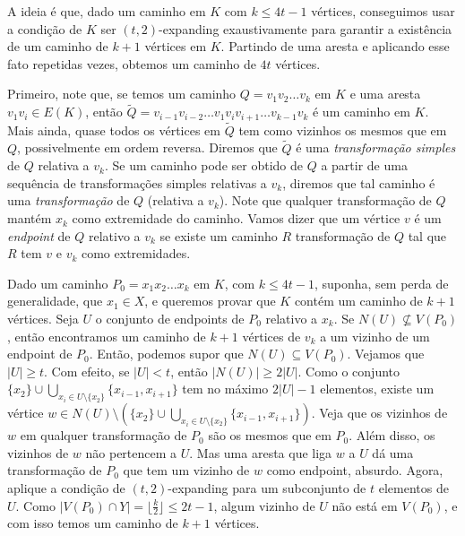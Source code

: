 \begin{dem}
	A ideia é que, dado um caminho em $K$ com $k\leq4t-1$ vértices, conseguimos usar a condição de $K$ ser $(t,2)$-expanding exaustivamente para garantir a existência de um caminho de $k+1$ vértices em $K$. Partindo de uma aresta e aplicando esse fato repetidas vezes, obtemos um caminho de $4t$ vértices.
	
	Primeiro, note que, se temos um caminho $Q = v_1v_2\dots v_k$ em $K$ e uma aresta $v_1v_i\in E(K)$, então $\tilde{Q} = v_{i-1}v_{i-2}\dots v_1v_iv_{i+1}\dots v_{k-1}v_k$ é um caminho em $K$. Mais ainda, quase todos os vértices em $\tilde{Q}$ tem como vizinhos os mesmos que em $Q$, possivelmente em ordem reversa. Diremos que $\tilde{Q}$ é uma \emph{transformação simples} de $Q$ relativa a $v_k$. Se um caminho pode ser obtido de $Q$ a partir de uma sequência de transformações simples relativas a $v_k$, diremos que tal caminho é uma \emph{transformação} de $Q$ (relativa a $v_k$). Note que qualquer transformação de $Q$ mantém $x_k$ como extremidade do caminho. Vamos dizer que um vértice $v$ é um \emph{endpoint} de $Q$ relativo a $v_k$ se existe um caminho $R$ transformação de $Q$ tal que $R$ tem $v$ e $v_k$ como extremidades.
	
	Dado um caminho $P_0 = x_1x_2\dots x_k$ em $K$, com $k\leq 4t-1$, suponha, sem perda de generalidade, que $x_1\in X$, e queremos provar que $K$ contém um caminho de $k+1$ vértices. Seja $U$ o conjunto de endpoints de $P_0$ relativo a $x_k$. Se $N(U)\not\subseteq V(P_0)$, então encontramos um caminho de $k+1$ vértices de $v_k$ a um vizinho de um endpoint de $P_0$. Então, podemos supor que $N(U)\subseteq V(P_0)$. Vejamos que $|U|\geq t$. Com efeito, se $|U|<t$, então $|N(U)|\geq2|U|$. Como o conjunto $\{x_2\}\cup\bigcup_{x_i\in U\setminus\{x_2\}}\{x_{i-1}, x_{i+1}\}$ tem no máximo $2|U|-1$ elementos, existe um vértice $w\in N(U)\setminus(\{x_2\}\cup\bigcup_{x_i\in U\setminus\{x_2\}}\{x_{i-1}, x_{i+1}\})$. Veja que os vizinhos de $w$ em qualquer transformação de $P_0$ são os mesmos que em $P_0$. Além disso, os vizinhos de $w$ não pertencem a $U$. Mas uma aresta que liga $w$ a $U$ dá uma transformação de $P_0$ que tem um vizinho de $w$ como endpoint, absurdo.  Agora, aplique a condição de $(t,2)$-expanding para um subconjunto de $t$ elementos de $U$. Como $|V(P_0)\cap Y| = \lfloor\frac{k}{2}\rfloor\leq 2t-1$, algum vizinho de $U$ não está em $V(P_0)$, e com isso temos um caminho de $k+1$ vértices.
	
\end{dem}

